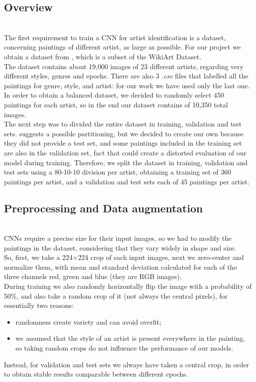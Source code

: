 \documentclass{article}
\begin{document}
\subsection{Overview}\mbox{}\\
The first requirement to train a CNN for artist identification is a dataset, concerning paintings of different artist, as large as possible. For our project we obtain a dataset from \cite{ArtGANDataset}, which is a subset of the WikiArt Dataset. \\
The dataset contains about 19,000 images of 23 different artists, regarding very different styles, genres  and epochs. There are also 3 \textit{.csv} files that labelled all the paintings for genre, style, and artist: for our work we have used only the last one. In order to obtain a balanced dataset, we decided to randomly select 450 paintings for each artist, so in the end our dataset contains of 10,350 total images. \\
The next step was to divided the entire dataset in training, validation and test sets. \cite{ArtGANDataset} suggests a possible partitioning, but we decided to create our own because they did not provide a test set, and some paintings included in the training set are also in the validation set, fact that could create a distorted evaluation of our model during training. Therefore, we split the dataset in training, validation and test sets using a 80-10-10 division per artist, obtaining a training set of 360 paintings per artist, and a validation and test sets each of 45 paintings per artist.

\subsection{Preprocessing and Data augmentation}\mbox{}\\
CNNs require a precise size for their input images, so we had to modify the paintings in the dataset, considering that they vary widely in shape and size.\\
So, first, we take a 224$\times$224 crop of each input images, next we zero-center and normalize them, with mean and standard deviation calculated for each of the three channels red, green and blue (they are RGB images).  \\
During training we also randomly horizontally flip the image with a probability of 50\%, and also take a random crop of it (not always the central pixels), for essentially two reasons:
\begin{itemize}
	\item randomness create variety and can avoid overfit;
	\item we assumed that the style of an artist is present everywhere in the painting, so taking random crops do not influence the performance of our models.
\end{itemize}
Instead, for validation and test sets we always have taken a central crop, in order to obtain stable results comparable between different epochs.
\end{document}
